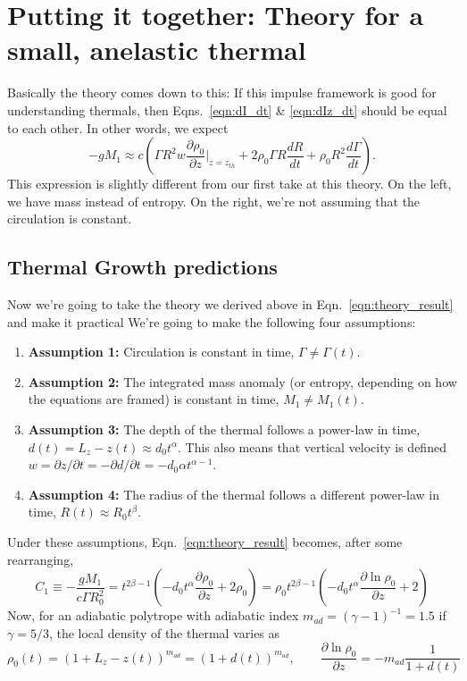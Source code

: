 \documentclass[onecolumn, amsmath, amsfonts, amssymb]{aastex62}
\begin{document}
\section{Putting it together: Theory for a small, anelastic thermal}
Basically the theory comes down to this: If this impulse framework is good for understanding
thermals, then Eqns.~\ref{eqn:dI_dt} \& \ref{eqn:dIz_dt} should be equal to each other.
In other words, we expect
\begin{equation}
-g M_1 \approx c\left(\Gamma R^2 w \frac{\partial \rho_0}{\partial z}\bigg|_{z=z_{th}}
+ 2 \rho_0 \Gamma R \frac{dR}{dt} + \rho_0 R^2 \frac{d\Gamma}{dt}\right).
\label{eqn:theory_result}
\end{equation}
This expression is slightly different from our first take at this theory. On the left,
we have mass instead of entropy. On the right, we're not assuming that the circulation
is constant.

\subsection{Thermal Growth predictions}
Now we're going to take the theory we derived above in Eqn.~\ref{eqn:theory_result}
and make it practical  We're going to make the following four assumptions:
\begin{enumerate}
\item \textbf{Assumption 1:} Circulation is constant in time, $\Gamma \neq \Gamma(t)$.
\item \textbf{Assumption 2:} The integrated mass anomaly (or entropy, depending on how the equations
are framed) is constant in time, $M_1 \neq M_1(t)$.
\item \textbf{Assumption 3:} The depth of the thermal follows a power-law in time,
$d(t) = L_z - z(t) \approx d_0 t^{\alpha}$. This also means that vertical velocity is defined
$w = \partial z / \partial t = - \partial d / \partial t = - d_0 \alpha t^{\alpha - 1}$.
\item \textbf{Assumption 4:} The radius of the thermal follows a different power-law in time,
$R(t) \approx R_0 t^{\beta}$.
\end{enumerate}
Under these assumptions, Eqn.~\ref{eqn:theory_result} becomes, after some rearranging,
\begin{equation}
C_1 \equiv -\frac{g M_1}{c \Gamma R_0^2}  = 
t^{2\beta - 1}\left(-d_0 t^{\alpha} \frac{\partial \rho_0}{\partial z} + 2 \rho_0 \right)
=
\rho_0 t^{2\beta - 1}\left(-d_0 t^{\alpha} \frac{\partial \ln \rho_0}{\partial z} + 2 \right)
\label{eqn:simple_theory}
\end{equation}
Now, for an adiabatic polytrope with adiabatic index $m_{ad} = (\gamma - 1)^{-1} = 1.5$ if $\gamma = 5/3$,
the local density of the thermal varies as
$$
\rho_0(t) = (1 + L_z - z(t))^{m_{ad}} = (1 + d(t))^{m_{ad}}, \qquad
\frac{\partial \ln \rho_0}{\partial z} = -m_{ad}\frac{1}{1 + d(t)}
$$
\end{document}
